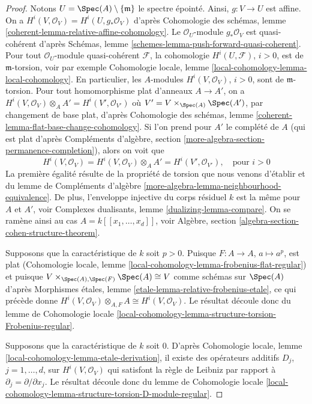 \begin{proof}
Notons $U = \Spec(A) \setminus \{\mathfrak m\}$ le spectre épointé.
Ainsi, $g : V \to U$ est affine.
On a $H^i(V, \mathcal{O}_V) = H^i(U, g_*\mathcal{O}_V)$ d'après
Cohomologie des schémas, lemme \ref{coherent-lemma-relative-affine-cohomology}.
Le $\mathcal{O}_U$-module $g_*\mathcal{O}_V$ est quasi-cohérent d'après
Schémas, lemme \ref{schemes-lemma-push-forward-quasi-coherent}.
Pour tout $\mathcal{O}_U$-module quasi-cohérent $\mathcal{F}$,
la cohomologie $H^i(U, \mathcal{F})$, $i > 0$,
est de $\mathfrak m$-torsion, voir par exemple
Cohomologie locale, lemme \ref{local-cohomology-lemma-local-cohomology}.
En particulier, les $A$-modules $H^i(V, \mathcal{O}_V)$, $i > 0$,
sont de $\mathfrak m$-torsion.
Pour tout homomorphisme plat d'anneaux $A \to A'$, on a
$H^i(V, \mathcal{O}_V) \otimes_A A' = H^i(V', \mathcal{O}_{V'})$
où $V' = V \times_{\Spec(A)} \Spec(A')$, par changement de base plat, d'après
Cohomologie des schémas, lemme \ref{coherent-lemma-flat-base-change-cohomology}.
Si l'on prend pour $A'$ le complété de $A$ (qui est plat d'après
Compléments d'algèbre, section \ref{more-algebra-section-permanence-completion}),
alors on voit que
$$
H^i(V, \mathcal{O}_V) = H^i(V, \mathcal{O}_V) \otimes_A A' =
H^i(V', \mathcal{O}_{V'}),\quad\text{pour } i > 0
$$
La première égalité résulte de la propriété de torsion que nous venons d'établir et du
lemme de Compléments d'algèbre \ref{more-algebra-lemma-neighbourhood-equivalence}.
De plus, l'enveloppe injective du corps résiduel $k$
est la même pour $A$ et $A'$, voir
Complexes dualisants, lemme \ref{dualizing-lemma-compare}.
On se ramène ainsi au cas $A = k[[x_1, \ldots, x_d]]$, voir
Algèbre, section \ref{algebra-section-cohen-structure-theorem}.

\medskip\noindent
Supposons que la caractéristique de $k$ soit $p > 0$. Puisque $F : A \to A$,
$a \mapsto a^p$, est plat (Cohomologie locale, lemme
\ref{local-cohomology-lemma-frobenius-flat-regular})
et puisque $V \times_{\Spec(A), \Spec(F)} \Spec(A) \cong V$ comme schémas
sur $\Spec(A)$ d'après
Morphismes \'etales, lemme \ref{etale-lemma-relative-frobenius-etale},
ce qui précède donne
$H^i(V, \mathcal{O}_V) \otimes_{A, F} A \cong H^i(V, \mathcal{O}_V)$.
Le résultat découle donc du
lemme de Cohomologie locale
\ref{local-cohomology-lemma-structure-torsion-Frobenius-regular}.

\medskip\noindent
Supposons que la caractéristique de $k$ soit $0$. D'après
Cohomologie locale, lemme \ref{local-cohomology-lemma-etale-derivation},
il existe des opérateurs additifs $D_j$, $j = 1, \ldots, d$, sur
$H^i(V, \mathcal{O}_V)$ qui satisfont la règle de Leibniz par
rapport à $\partial_j = \partial/\partial x_j$.
Le résultat découle donc du lemme de Cohomologie locale
\ref{local-cohomology-lemma-structure-torsion-D-module-regular}.
\end{proof}

